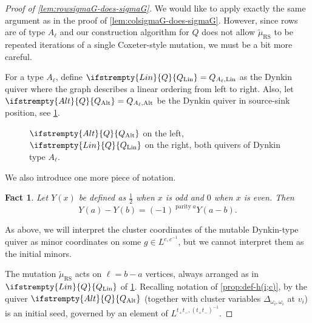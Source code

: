 \documentclass{amsart}
\theoremstyle{plain}
\newtheorem{fact}[theorem]{Fact}
\theoremstyle{definition}
\theoremstyle{remark}
\newcommand{\fundamentalweight}{\omega}
\newcommand{\genminoryz}[3]{\Delta_{{#1} \fundamentalweight_{#3}, {#2}%
    \fundamentalweight_{#3}}}
\newcommand{\Q}[1]{\ifstrempty{#1}{Q}{Q_{\text{#1}}}}
\newcommand{\muint}[1]{\widetilde{\mu}_{\text{#1}}}
\newcommand{\murowperm}{\muint{RS}}
\begin{document}
  \begin{proof}[Proof of \cref{lem:rowsigmaG-does-sigmaG}]
    We would like to apply exactly the same argument as in the proof of
    \cref{lem:colsigmaG-does-sigmaG}. However, since rows are of type
    $A_{\ell}$ and our construction algorithm for $Q$ does not allow
    $\murowperm$ to be repeated iterations of a single Coxeter-style
    mutation, we must be a bit more careful.

    For a type $A_{\ell}$, define $\Q{Lin} = Q_{A_{\ell},\text{Lin}}$ as
    the Dynkin quiver where the graph describes a linear ordering from
    left to right. Also, let $\Q{Alt} = Q_{A_{\ell},\text{Alt}}$ be the
    Dynkin quiver in source-sink position, see
    \cref{fig:dynkin-type-Al}.

    \begin{figure}[h]
      \centering 

      \caption{$\Q{Alt}$ on the left, $\Q{Lin}$ on the right, both
        quivers of Dynkin type $A_{\ell}$.
        \label{fig:dynkin-type-Al}
      }
    \end{figure}

    We also introduce one more piece of notation.
    \begin{fact}
      \label{fac:Y-sub-parity}
      Let $Y(x)$ be defined as $\frac{1}{2}$ when $x$ is odd and $0$
      when $x$ is even. Then \[ Y(a) - Y(b) =
        (-1)^{\operatorname{parity} a}Y(a-b). \]
    \end{fact}

    As above, we will interpret the cluster coordinates of the mutable
    Dynkin-type quiver as minor coordinates on some $g \in
    L^{c,c^{-1}}$, but we cannot interpret them as the initial minors.

    The mutation $\murowperm$ acts on $\ell = b - a$ vertices, always
    arranged as in $\Q{Lin}$ of \cref{fig:dynkin-type-Al}. Recalling
    notation of \cref{prop:def-h(i;c)}, by \cite{yangzelevinsky2008} the
    quiver $\Q{Alt}$ (together with cluster variables
    $\genminoryz{}{}{i}$ at $v_{i}$) is an initial seed, governed by an
    element of $L^{t_{+}t_{-},(t_{+}t_{-})^{-1}}$.


\end{proof}
\end{document}
